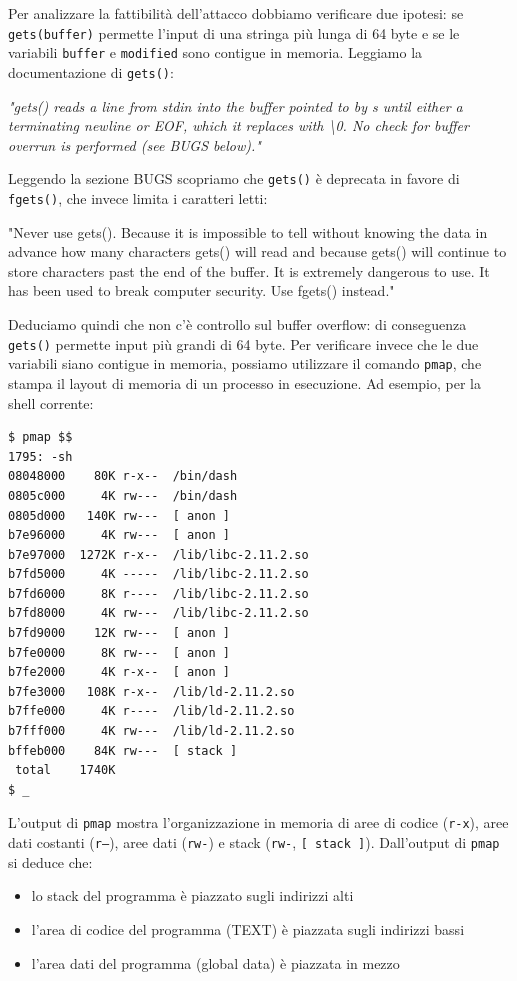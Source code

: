 Per analizzare la fattibilità dell'attacco dobbiamo verificare due ipotesi: se \texttt{gets(buffer)} permette l'input di una stringa più lunga di 64 byte e se le variabili \texttt{buffer} e \texttt{modified} sono contigue in memoria. Leggiamo la documentazione di \texttt{gets()}:
\begin{center}
    \textit{"gets() reads a line from stdin into the buffer
pointed to by s until either a terminating
newline or EOF, which it replaces with  \textbackslash0.
No check for buffer overrun is performed
(see BUGS below)."}
\end{center}
Leggendo la sezione BUGS scopriamo che \texttt{gets()} è deprecata in favore di \texttt{fgets()}, che invece limita i caratteri letti:
\begin{center}
    "Never use gets().
Because it is impossible to tell without knowing the
data in advance how many characters gets() will read
and because gets() will continue to store characters
past the end of the buffer.
It is extremely dangerous to use.
It has been used to break computer security.
Use fgets() instead."
\end{center}
Deduciamo quindi che non c'è controllo sul buffer overflow: di conseguenza \texttt{gets()} permette input più grandi di 64 byte. Per verificare invece che le due variabili siano contigue in memoria, possiamo utilizzare il comando \texttt{pmap}, che stampa il layout di memoria di un processo in esecuzione. Ad esempio, per la shell corrente:
\begin{mdframed}[backgroundcolor=white!20,shadow=false]
\begin{lstlisting}
$ pmap $$
1795: -sh 
08048000    80K r-x--  /bin/dash
0805c000     4K rw---  /bin/dash
0805d000   140K rw---  [ anon ]
b7e96000     4K rw---  [ anon ]
b7e97000  1272K r-x--  /lib/libc-2.11.2.so
b7fd5000     4K -----  /lib/libc-2.11.2.so
b7fd6000     8K r----  /lib/libc-2.11.2.so
b7fd8000     4K rw---  /lib/libc-2.11.2.so
b7fd9000    12K rw---  [ anon ]
b7fe0000     8K rw---  [ anon ]
b7fe2000     4K r-x--  [ anon ]
b7fe3000   108K r-x--  /lib/ld-2.11.2.so
b7ffe000     4K r----  /lib/ld-2.11.2.so
b7fff000     4K rw---  /lib/ld-2.11.2.so
bffeb000    84K rw---  [ stack ] 
 total    1740K 
$ _ 
\end{lstlisting}
\end{mdframed}
L'output di \texttt{pmap} mostra l'organizzazione in memoria di aree di codice (\texttt{r-x}), aree dati costanti (\texttt{r--}), aree dati (\texttt{rw-}) e stack (\texttt{rw-}, \texttt{[ stack ]}). Dall'output di \texttt{pmap} si deduce che:
\begin{itemize}
    \item lo stack del programma è piazzato sugli indirizzi alti
    \item l'area di codice del programma (TEXT) è piazzata sugli indirizzi bassi
    \item l'area dati del programma (global data) è piazzata in mezzo
\end{itemize}

